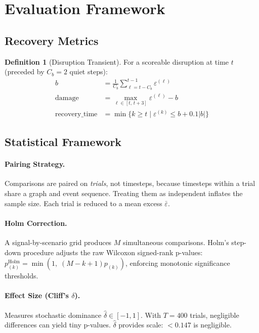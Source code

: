 \documentclass[11pt,a4paper]{article}
\theoremstyle{definition}
\newtheorem{definition}{Definition}[section]
\newcommand{\excess}{\varepsilon}
\begin{document}
\section{Evaluation Framework}
\label{sec:evaluation}

\subsection{Recovery Metrics}

\begin{definition}[Disruption Transient]
  For a scoreable disruption at time $t$ (preceded by $C_b=2$ quiet steps):
  \begin{align}
    b &= \frac{1}{C_b}\sum_{\ell=t-C_b}^{t-1} \excess^{(\ell)} \\
    \text{damage} &= \max_{\ell\in[t,\,t+3]}\excess^{(\ell)} - b \\
    \text{recovery\_time} &= \min\{k\ge t \mid \excess^{(k)} \le b + 0.1|b|\}
  \end{align}
\end{definition}

\subsection{Statistical Framework}

\paragraph{Pairing Strategy.}
Comparisons are paired on \emph{trials}, not timesteps, because timesteps within a trial
share a graph and event sequence. Treating them as independent inflates the sample size.
Each trial is reduced to a mean excess $\bar\excess$.

\paragraph{Holm Correction.}
A signal-by-scenario grid produces $M$ simultaneous comparisons. Holm's step-down
procedure adjusts the raw Wilcoxon signed-rank p-values:
$p_{(k)}^{\mathrm{Holm}} = \min(1,\;(M-k+1)p_{(k)})$,
enforcing monotonic significance thresholds.

\paragraph{Effect Size (Cliff's $\delta$).}
Measures stochastic dominance $\hat\delta \in [-1,1]$. With $T=400$ trials, negligible
differences can yield tiny p-values. $\hat\delta$ provides scale: $<0.147$ is negligible.
\end{document}
